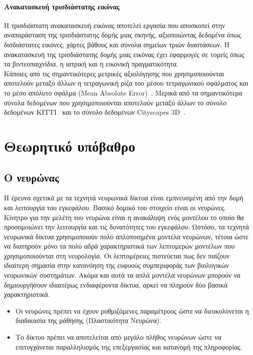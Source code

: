 \documentclass[12pt]{article}
\numberwithin{equation}{section}
\begin{document}
\paragraph{Ανακατασκευή τρισδιάστατης εικόνας\\[0.5cm]}

Η τρισδιάστατη ανακατασκευή εικόνας αποτελεί εργασία που αποσκοπεί στην αναπαράσταση της τρισδιάστατης δομής μιας σκηνής, αξιοποιώντας δεδομένα όπως δισδιάστατες εικόνες, χάρτες βάθους και σύνολα σημείων τριών διαστάσεων. Η ανακατασκευή της τρισδιάστατης δομής μιας εικόνας έχει εφαρμογές σε τομείς όπως τα βιντεοπαιχνίδια, η ιατρική και η εικονική πραγματικότητα.\\

Κάποιες από τις σημαντικότερες μετρικές αξιολόγησης που χρησιμοποιούνται αποτελούν μεταξύ άλλων η τετραγωνική ρίζα του μέσου τετραγωνικού σφάλματος και το μέσο απόλυτο σφάλμα (Mean Absolute Error)~\cite{s24072314}. Μερικά από τα σημαντικότερα σύνολα δεδομένων που χρησιμοποιούνται αποτελούν μεταξύ άλλων το σύνολο δεδομένων KITTI~\cite{Geiger2013IJRR} και το σύνολο δεδομένων Cityscapes 3D~\cite{gählert2020cityscapes3ddatasetbenchmark}.
\newpage

\section{Θεωρητικό υπόβαθρο}

\subsection{Ο νευρώνας}

Η έρευνα σχετικά με τα τεχνητά νευρωνικά δίκτυα είναι εμπνευσμένη από την δομή και λειτουργία του εγκεφάλου. Βασικό δομικό του στοιχείο είναι  οι νευρώνες. Κίνητρο για την μελέτη του νευρώνα είναι η ανακάλυψη ενός μοντέλου το οποίο θα προσομοιώνει την λειτουργία και τις δυνατότητες του εγκεφάλου. Ωστόσο, τα τεχνητά νευρωνικά δίκτυα χρησιμοποιούν πολύ απλοποιημένα μοντέλα νευρώνων, τέτοια ώστε να διατηρούν μόνο τα πολύ αδρά χαρακτηριστικά των λεπτομερών μοντέλων που χρησιμοποιούνται στη νευρολογία. Οι λεπτομέρειες πιστεύεται πως δεν παίζουν ιδιαίτερη σημασία στην κατανόηση της ευφυούς συμπεριφοράς των βιολογικών νευρωνικών συστημάτων. Ακόμα και αυτά τα απλά μοντέλα νευρώνων μπορούν να δημιουργήσουν ιδιαιτέρως ενδιαφέροντα δίκτυα, αρκεί να πληρούν δύο βασικά χαρακτηριστικά.\\

\begin{itemize}
    \item Οι νευρώνες πρέπει να έχουν ρυθμιζόμενες παραμέτρους ώστε να διευκολύνεται η διαδικασία της μάθησης (Πλαστικότητα Νευρώνα).
    \item Το δίκτυο πρέπει να αποτελείται από μεγάλο πλήθος νευρώνων ώστε να επιτυγχάνεται παραλληλισμός της επεξεργασίας και κατανομή της πληροφορίας.\\
\end{itemize}
\end{document}
